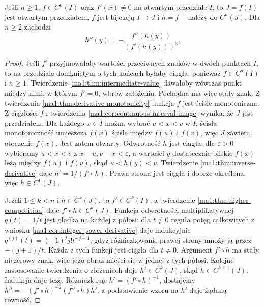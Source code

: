 \begin{wniosek}
\label{ma1:cor:higher-inverse}
Jeśli $n\ge1$, $f\in C^n(I)$ oraz $f'(x)\ne0$ na otwartym przedziale $I$, to $J=f(I)$ jest otwartym przedziałem, $f$ jest bijekcją $I\to J$ i $h=f^{-1}$ należy do $C^n(J)$. Dla $n\ge2$ zachodzi
\[
 h''(y)=-\frac{f''(h(y))}{(f'(h(y)))^3}.
\]
\end{wniosek}
\begin{proof}
Jeśli $f'$ przyjmowałaby wartości przeciwnych znaków w dwóch punktach $I$, to na przedziale domkniętym o tych końcach byłaby ciągła, ponieważ $f\in C^n(I)$ i $n\ge1$. Twierdzenie \ref{ma1:thm:intermediate-value} dawałoby wówczas punkt między nimi, w którym $f'=0$, wbrew założeniu. Pochodna ma więc stały znak. Z twierdzenia \ref{ma1:thm:derivative-monotonicity} funkcja $f$ jest ściśle monotoniczna. Z ciągłości $f$ i twierdzenia \ref{ma1:cor:continuous-interval-image} wynika, że $J$ jest przedziałem. Dla każdego $x\in I$ można wybrać $u<x<v$ w $I$; ścisła monotoniczność umieszcza $f(x)$ ściśle między $f(u)$ i $f(v)$, więc $J$ zawiera otoczenie $f(x)$. Jest zatem otwarty. Odwrotność $h$ jest ciągła: dla $\varepsilon>0$ wybieramy $u<x<v$ z $x-u,v-x<\varepsilon$, a wartości $y$ dostatecznie bliskie $f(x)$ leżą między $f(u)$ i $f(v)$, skąd $u<h(y)<v$. Twierdzenie \ref{ma1:thm:inverse-derivative} daje $h'=1/(f'\circ h)$. Prawa strona jest ciągła i dobrze określona, więc $h\in C^1(J)$.

Jeżeli $1\le k<n$ i $h\in C^k(J)$, to $f'\in C^k(I)$, a twierdzenie \ref{ma1:thm:higher-composition} daje $f'\circ h\in C^k(J)$. Funkcja odwrotności multiplikatywnej $q(t)=1/t$ jest gładka na każdej z półosi: dla $t\ne0$ reguła potęg całkowitych z wniosku \ref{ma1:cor:integer-power-derivative} daje indukcyjnie $q^{(j)}(t)=(-1)^j j!t^{-j-1}$, gdyż różniczkowanie prawej strony mnoży ją przez $-(j+1)/t$. Każda z tych funkcji jest ciągła dla $t\ne0$. Argument $f'\circ h$ ma stały niezerowy znak, więc jego obraz mieści się w jednej z tych półosi. Kolejne zastosowanie twierdzenia o złożeniach daje $h'\in C^k(J)$, skąd $h\in C^{k+1}(J)$. Indukcja daje tezę. Różniczkując $h'=(f'\circ h)^{-1}$, dostajemy $h''=-(f'\circ h)^{-2}(f''\circ h)h'$, a podstawienie wzoru na $h'$ daje żądaną równość.
\end{proof}

